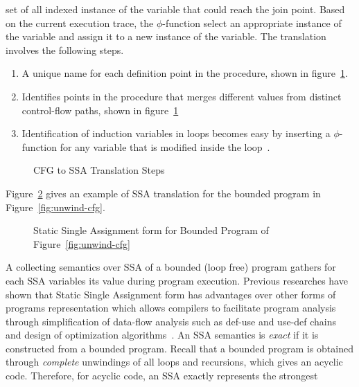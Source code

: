 {set of all indexed instance of the variable that could reach the join point.
Based on the current execution trace, the $\phi$-function select an appropriate
instance of the variable and assign it to a new instance of the variable. The
translation involves the following steps. 
%
\begin{enumerate}
\item A unique name for each definition point in the procedure, shown in
  figure~\ref{fig:ssa-simple}. 
\item Identifies points in the procedure that merges different values from
  distinct control-flow paths, shown in figure~\ref{fig:ssa-simple}  
\item Identification of induction variables in loops becomes easy by inserting a
  $\phi$-function for any variable that is modified inside the
    loop~\cite{Gerlek:1995}.
\end{enumerate}
%
\begin{figure}[htbp]
\centering
\vspace*{-0.2cm}
\caption{CFG to SSA Translation Steps
  \label{fig:ssa-simple}}
\end{figure}
%
Figure~\ref{fig:unwind-ssa} gives an example of SSA translation for the bounded
program in Figure~\ref{fig:unwind-cfg}.
%
\begin{figure}[htbp]
\centering
\vspace*{-0.2cm}
  \caption{Static Single Assignment form for Bounded Program of
  Figure~\ref{fig:unwind-cfg}
  \label{fig:unwind-ssa}}
\end{figure}
%
%
A collecting semantics over SSA of a bounded (loop free) program gathers for each 
SSA variables its value during program execution.
%
%
Previous researches have shown that Static Single Assignment form has
advantages over other forms of programs representation which allows compilers to
facilitate program analysis through simplification of data-flow analysis such as
def-use and use-def chains and design of optimization
algorithms~\cite{ssa1991,ssa1,ssa2}. 
%
 An SSA semantics is \emph{exact} if it is
constructed from a bounded program.  Recall that a bounded program is 
obtained through \emph{complete} unwindings of all loops and recursions, which
gives an acyclic code.  
Therefore, for acyclic code, an SSA exactly represents the strongest 
}
